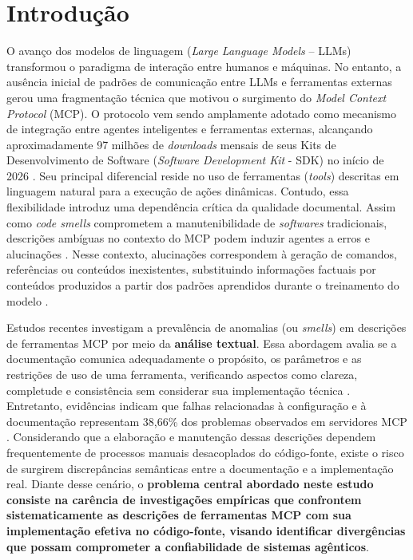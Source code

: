 \section{Introdução}
\label{sec:introducao}
O avanço dos modelos de linguagem (\textit{Large Language Models} -- LLMs) transformou o paradigma de interação entre humanos e máquinas. No entanto, a ausência inicial de padrões de comunicação entre LLMs e ferramentas externas gerou uma fragmentação técnica que motivou o surgimento do \textit{Model Context Protocol} (MCP). O protocolo vem sendo amplamente adotado como mecanismo de integração entre agentes inteligentes e ferramentas externas, alcançando aproximadamente 97 milhões de \textit{downloads} mensais de seus Kits de Desenvolvimento de Software (\textit{Software Development Kit} - SDK) no início de 2026 \cite{Avaya2026}. Seu principal diferencial reside no uso de ferramentas (\textit{tools}) descritas em linguagem natural para a execução de ações dinâmicas. Contudo, essa flexibilidade introduz uma dependência crítica da qualidade documental. Assim como \textit{code smells} comprometem a manutenibilidade de \textit{softwares} tradicionais, descrições ambíguas no contexto do MCP podem induzir agentes a erros e alucinações \cite{Taraghi2026}. Nesse contexto, alucinações correspondem à geração de comandos, referências ou conteúdos inexistentes, substituindo informações factuais por conteúdos produzidos a partir dos padrões aprendidos durante o treinamento do modelo \cite{Taraghi2026}.

Estudos recentes investigam a prevalência de anomalias (ou \textit{smells}) em descrições de ferramentas MCP por meio da \textbf{análise textual}. Essa abordagem avalia se a documentação comunica adequadamente o propósito, os parâmetros e as restrições de uso de uma ferramenta, verificando aspectos como clareza, completude e consistência sem considerar sua implementação técnica \cite{mcpAtFirstGlance}. Entretanto, evidências indicam que falhas relacionadas à configuração e à documentação representam 38,66\% dos problemas observados em servidores MCP \cite{Taraghi2026}. Considerando que a elaboração e manutenção dessas descrições dependem frequentemente de processos manuais desacoplados do código-fonte, existe o risco de surgirem discrepâncias semânticas entre a documentação e a implementação real. Diante desse cenário, o \textbf{problema central abordado neste estudo consiste na carência de investigações empíricas que confrontem sistematicamente as descrições de ferramentas MCP com sua implementação efetiva no código-fonte, visando identificar divergências que possam comprometer a confiabilidade de sistemas agênticos}.

